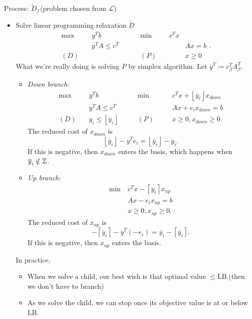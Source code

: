 Process: \(\widetilde{D}_{\mathcal{I}}\)(problem chosen from \(\mathcal{L}\))
\begin{itemize}
	\item Solve linear programming relaxation \(\widetilde{D}\)
	      \[
		      \begin{alignedat}{5}
			      \max ~&y^{T}b\qquad\qquad&&\min~&c^{T}x\\
			      &y^{T}A\leq c^{T} 				&&		&&Ax = b\\
			      (D)\quad	& 	&&(P)\quad&&x\geq  0
		      \end{alignedat}.
	      \]
	      What we're really doing is solving \(P\) by simplex algorithm. Let \(\overline{y}^{T}\coloneqq c^{T}_{\beta}A^{T}_{\beta}\).
	      \begin{itemize}
		      \item \emph{Down branch}:
		            \[
			            \begin{alignedat}{5}
				            \max ~	&y^{T}b\qquad\qquad				&&\min~	&&c^{T}x+\left\lfloor \overline{y}_{i} \right\rfloor x_{down}\\
				            &y^{T}A\leq c^{T} 				&&		&&Ax + e_{i}x_{down} = b\\
				            (D)\quad& y_{i}\leq \left\lfloor \overline{y}_{i} \right\rfloor	&&(P)\quad&&x\geq 0, x_{down}\geq 0.
			            \end{alignedat}
		            \]
		            The reduced cost of \(x_{down}\) is
		            \[
			            \left\lfloor \overline{y}_{i} \right\rfloor - \overline{y}^{T}e_{i} = \left\lfloor \overline{y}_{i} \right\rfloor - \overline{y}_{i}.
		            \]
		            If this is negative, then \(x_{down}\) enters the basis, which happens when \(\overline{y}_{i}\notin\mathbb{\MakeUppercase{Z}}\).
		      \item \emph{Up branch}:
		            \begin{align*}
			            \min~ & c^Tx  - \left\lceil \overline{y}_{i} \right\rceil x_{up} \\
			                  & Ax - e_{i}x_{up}= b                                      \\
			                  & x\geq 0, x_{up}\geq 0.
		            \end{align*}
		            The reduced cost of \(x_{up}\) is
		            \[
			            -\left\lceil \overline{y}_{i} \right\rceil - \overline{y}^{T}(-e_{i}) = \overline{y}_{i} - \left\lceil \overline{y}_{i} \right\rceil.
		            \]
		            If this is negative, then \(x_{up}\) enters the basis.
	      \end{itemize}
	      \begin{remark}
		      In practice,
		      \begin{itemize}
			      \item When we solve a child, our best wish is that optimal value \(\leq \mathrm{LB}\).(then we don't have to branch)
			      \item As we solve the child, we can stop once its objective value is at or below \(\mathrm{LB} \).
		      \end{itemize}
	      \end{remark}
\end{itemize}

